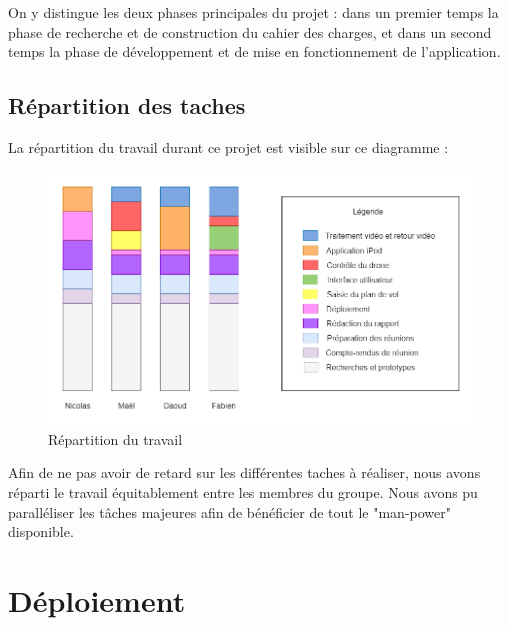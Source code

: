 \documentclass{article}
\begin{document}
    On y distingue les deux phases principales du projet : dans un premier temps la phase de recherche et de construction du cahier des charges, et dans un second temps la phase de développement et de mise en fonctionnement de l'application.
    
    \newpage
	\subsection{Répartition des taches}
	La répartition du travail durant ce projet est visible sur ce diagramme :
	
    \begin{center}
	\begin{figure}[!h]
	\includegraphics[scale=0.35]{repartition_taches.png}
	\caption{Répartition du travail}
	\end{figure}
    \end{center}
    
	Afin de ne pas avoir de retard sur les différentes taches à réaliser, nous avons réparti le travail équitablement entre les membres du groupe. Nous avons pu paralléliser les tâches majeures afin de bénéficier de tout le "man-power" disponible.\\
	
\section{Déploiement}
\end{document}

